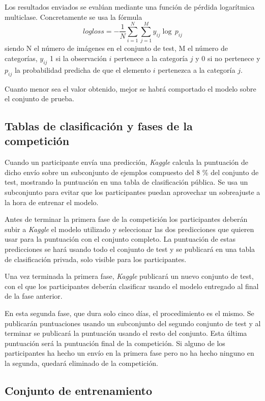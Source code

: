 Los resultados enviados se evalúan mediante una función de pérdida logarítmica multiclase. Concretamente se usa la fórmula
\[
  logloss =
  - \frac{1}{N} \sum_{i=1}^N \sum_{j=1}^M y_{ij} \log \, p_{ij}
\]
 siendo N el número de imágenes en el conjunto de test, M el número de
 categorías, $y_{ij}$ 1 si la observación $i$ pertenece a la categoría $j$ y 0 si no
 pertenece y $p_{ij}$ la probabilidad predicha de que el elemento $i$ pertenezca
 a la categoría $j$.

 Cuanto menor sea el valor obtenido, mejor se habrá comportado el modelo sobre el conjunto de prueba.

\subsection{Tablas de clasificación y fases de la competición}

Cuando un participante envía una predicción, \textit{Kaggle} calcula la
puntuación de dicho envío sobre un subconjunto de ejemplos compuesto del 8 \%
del conjunto de test, mostrando la puntuación en una tabla de clasificación
pública. Se usa un subconjunto para evitar que los participantes puedan
aprovechar un sobreajuste a la hora de entrenar el modelo.

Antes de terminar la primera fase de la competición los participantes deberán subir a \textit{Kaggle} el modelo utilizado y seleccionar las dos predicciones que quieren usar para la puntuación con el conjunto completo. La puntuación de estas predicciones se hará usando todo el conjunto de test y se publicará en una tabla de clasificación privada, solo visible para los participantes. 

Una vez terminada la primera fase, \textit{Kaggle} publicará un nuevo conjunto de test, con el que los participantes deberán clasificar usando el modelo entregado al final de la fase anterior.

En esta segunda fase, que dura solo cinco días, el procedimiento es el mismo. Se publicarán puntuaciones usando un subconjunto del segundo conjunto de test y al terminar se publicará la puntuación usando el resto del conjunto. Esta última puntuación será la puntuación final de la competición. Si alguno de los participantes ha hecho un envío en la primera fase pero no ha hecho ninguno en la segunda, quedará eliminado de la competición.

\subsection{Conjunto de entrenamiento}
\label{dataset}

